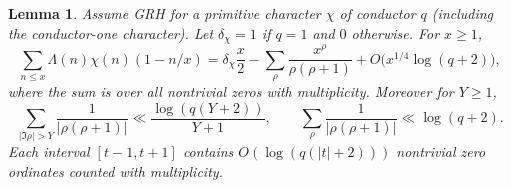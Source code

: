 \documentclass[11pt]{article}
\newtheorem{lemma}[theorem]{Lemma}
\theoremstyle{remark}\newtheorem{remark}[theorem]{Remark}
\begin{document}
\begin{lemma}\label{lem:explicit}
Assume GRH for a primitive character $\chi$ of conductor $q$ (including the conductor-one character). Let $\delta_\chi=1$ if $q=1$ and $0$ otherwise. For $x\ge1$,
\begin{equation}\label{eq:explicit}
\sum_{n\le x}\Lambda(n)\chi(n)(1-n/x)
=\delta_\chi\frac{x}{2}-\sum_{\rho}\frac{x^\rho}{\rho(\rho+1)}
+O\bigl(x^{1/4}\log(q+2)\bigr),
\end{equation}
where the sum is over all nontrivial zeros with multiplicity. Moreover for $Y\ge1$,
\begin{equation}\label{eq:zerotail}
\sum_{|\Im\rho|>Y}\frac1{|\rho(\rho+1)|}
\ll\frac{\log(q(Y+2))}{Y+1},\qquad
\sum_\rho\frac1{|\rho(\rho+1)|}\ll\log(q+2).
\end{equation}
Each interval $[t-1,t+1]$ contains $O(\log(q(|t|+2)))$ nontrivial zero ordinates counted with multiplicity.
\end{lemma}
\end{document}
